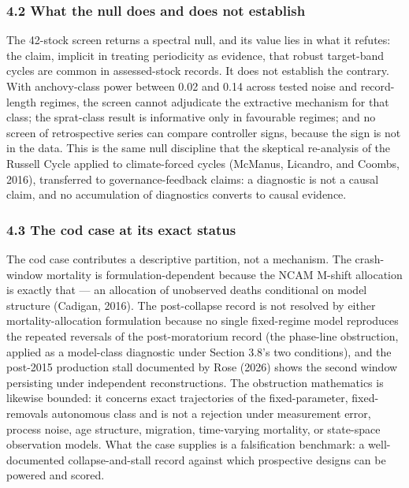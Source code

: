 \documentclass[11pt]{article}
\begin{document}
\subsubsection{4.2 What the null does and does not
establish}\label{what-the-null-does-and-does-not-establish}

The 42-stock screen returns a spectral null, and its value lies in what
it refutes: the claim, implicit in treating periodicity as evidence,
that robust target-band cycles are common in assessed-stock records. It
does not establish the contrary. With anchovy-class power between 0.02
and 0.14 across tested noise and record-length regimes, the screen
cannot adjudicate the extractive mechanism for that class; the
sprat-class result is informative only in favourable regimes; and no
screen of retrospective series can compare controller signs, because the
sign is not in the data. This is the same null discipline that the
skeptical re-analysis of the Russell Cycle applied to climate-forced
cycles (McManus, Licandro, and Coombs, 2016), transferred to
governance-feedback claims: a diagnostic is not a causal claim, and no
accumulation of diagnostics converts to causal evidence.

\subsubsection{4.3 The cod case at its exact
status}\label{the-cod-case-at-its-exact-status}

The cod case contributes a descriptive partition, not a mechanism. The
crash-window mortality is formulation-dependent because the NCAM M-shift
allocation is exactly that --- an allocation of unobserved deaths
conditional on model structure (Cadigan, 2016). The post-collapse record
is not resolved by either mortality-allocation formulation because no
single fixed-regime model reproduces the repeated reversals of the
post-moratorium record (the phase-line obstruction, applied as a
model-class diagnostic under Section 3.8's two conditions), and the
post-2015 production stall documented by Rose (2026) shows the second
window persisting under independent reconstructions. The obstruction
mathematics is likewise bounded: it concerns exact trajectories of the
fixed-parameter, fixed-removals autonomous class and is not a rejection
under measurement error, process noise, age structure, migration,
time-varying mortality, or state-space observation models. What the case
supplies is a falsification benchmark: a well-documented
collapse-and-stall record against which prospective designs can be
powered and scored.
\end{document}

